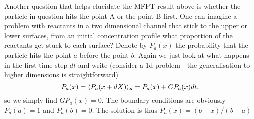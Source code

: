 \documentclass[11pt]{report}
\begin{document}
 Another question that helps elucidate the MFPT result above is whether the particle in question hits the point A or the point B first. One can imagine a problem with reactants in a two dimensional channel that stick to the upper or lower surfaces, from an initial concentration profile what proportion of the reactants get stuck to each surface? Denote by $P_a(x)$ the probability that the particle hits the point $a$ before the point $b$. Again we just look at what happens in the first time step $dt$ and write (consider a 1d problem - the generalisation to higher dimensions is straightforward)
\begin{equation}
P_a(x) = \langle P_a(x+ dX)\rangle_{\bf x} = P_a(x) + GP_a(x) dt,
\end{equation}
so we simply find $GP_a(x) = 0$. The boundary conditions are obviously $P_a(a)=1$ and $P_a(b)=0$. The solution is thus $P_a(x) = (b-x)/(b-a)$ 
\end{document}
